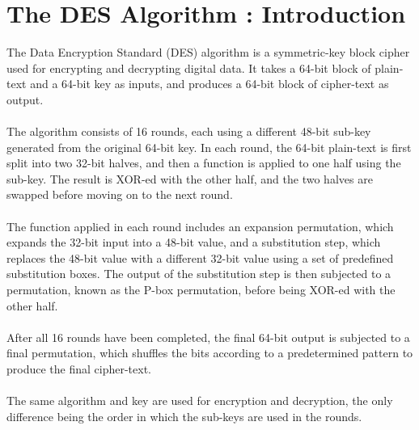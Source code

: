 \documentclass[12pt, letterpaper]{article}
\begin{document}




\newpage
\tableofcontents
\newpage
\listoftables
\listoffigures
\newpage

\section*{The DES Algorithm : Introduction}
\label{intro}
The Data Encryption Standard (DES) algorithm is a symmetric-key block cipher used for encrypting and decrypting digital data. It takes a 64-bit block of plain-text and a 64-bit key as inputs, and produces a 64-bit block of cipher-text as output.\\
\\
The algorithm consists of 16 rounds, each using a different 48-bit sub-key generated from the original 64-bit key. In each round, the 64-bit plain-text is first split into two 32-bit halves, and then a function is applied to one half using the sub-key. The result is XOR-ed with the other half, and the two halves are swapped before moving on to the next round.\\
\\
The function applied in each round includes an expansion permutation, which expands the 32-bit input into a 48-bit value, and a substitution step, which replaces the 48-bit value with a different 32-bit value using a set of predefined substitution boxes. The output of the substitution step is then subjected to a permutation, known as the P-box permutation, before being XOR-ed with the other half.\\
\\
After all 16 rounds have been completed, the final 64-bit output is subjected to a final permutation, which shuffles the bits according to a predetermined pattern to produce the final cipher-text.\\
\\
The same algorithm and key are used for encryption and decryption, the only difference being the order in which the sub-keys are used in the rounds.
\end{document}
